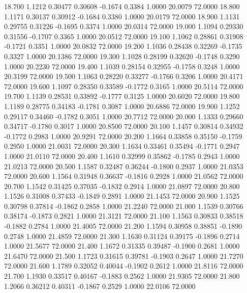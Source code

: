   18.700   1.1212   0.30477   0.30608  -0.1674   0.3384   1.0000  20.0079  72.0000
  18.800   1.1171   0.30137   0.30912  -0.1684   0.3380   1.0000  20.0179  72.0000
  18.900   1.1131   0.29755   0.31226  -0.1695   0.3374   1.0000  20.0314  72.0000
  19.000   1.1094   0.29330   0.31556  -0.1707   0.3365   1.0000  20.0512  72.0000
  19.100   1.1062   0.28861   0.31908  -0.1721   0.3351   1.0000  20.0832  72.0000
  19.200   1.1036   0.28438   0.32269  -0.1735   0.3327   1.0000  20.1386  72.0000
  19.300   1.1028   0.28199   0.32620  -0.1748   0.3290   1.0000  20.2230  72.0000
  19.400   1.1039   0.28154   0.32955  -0.1758   0.3248   1.0000  20.3199  72.0000
  19.500   1.1063   0.28220   0.33277  -0.1766   0.3206   1.0000  20.4171  72.0000
  19.600   1.1097   0.28350   0.33589  -0.1772   0.3165   1.0000  20.5114  72.0000
  19.700   1.1139   0.28531   0.33892  -0.1777   0.3125   1.0000  20.6020  72.0000
  19.800   1.1189   0.28775   0.34183  -0.1781   0.3087   1.0000  20.6886  72.0000
  19.900   1.1252   0.29117   0.34460  -0.1782   0.3051   1.0000  20.7712  72.0000
  20.000   1.1333   0.29660   0.34717  -0.1780   0.3017   1.0000  20.8500  72.0000
  20.100   1.1457   0.30814   0.34932  -0.1772   0.2983   1.0000  20.9291  72.0000
  20.200   1.1664   0.33858   0.35150  -0.1759   0.2950   1.0000  21.0031  72.0000
  20.300   1.1634   0.33461   0.35494  -0.1771   0.2947   1.0000  21.0110  72.0000
  20.400   1.1610   0.32999   0.35862  -0.1785   0.2943   1.0000  21.0213  72.0000
  20.500   1.1587   0.32487   0.36244  -0.1800   0.2937   1.0000  21.0353  72.0000
  20.600   1.1564   0.31948   0.36637  -0.1816   0.2928   1.0000  21.0562  72.0000
  20.700   1.1542   0.31425   0.37035  -0.1832   0.2914   1.0000  21.0897  72.0000
  20.800   1.1526   0.31008   0.37433  -0.1849   0.2891   1.0000  21.1453  72.0000
  20.900   1.1525   0.30798   0.37814  -0.1862   0.2858   1.0000  21.2240  72.0000
  21.000   1.1539   0.30766   0.38174  -0.1873   0.2821   1.0000  21.3121  72.0000
  21.100   1.1563   0.30833   0.38518  -0.1882   0.2784   1.0000  21.4005  72.0000
  21.200   1.1594   0.30958   0.38851  -0.1890   0.2748   1.0000  21.4859  72.0000
  21.300   1.1630   0.31124   0.39175  -0.1896   0.2714   1.0000  21.5677  72.0000
  21.400   1.1672   0.31335   0.39487  -0.1900   0.2681   1.0000  21.6470  72.0000
  21.500   1.1723   0.31615   0.39781  -0.1903   0.2647   1.0000  21.7270  72.0000
  21.600   1.1789   0.32052   0.40044  -0.1902   0.2612   1.0000  21.8116  72.0000
  21.700   1.1930   0.33517   0.40167  -0.1883   0.2562   1.0000  21.9305  72.0000
  21.800   1.2066   0.36212   0.40311  -0.1867   0.2529   1.0000  22.0106  72.0000
